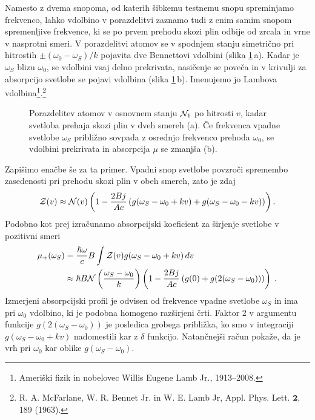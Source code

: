 Namesto z dvema snopoma, od katerih šibkemu testnemu snopu spreminjamo
frekvenco, lahko vdolbino v porazdelitvi zaznamo tudi z enim samim snopom
spremenljive frekvence, ki se po prvem prehodu skozi plin odbije od
zrcala in vrne v nasprotni smeri. V porazdelitvi atomov se
v spodnjem stanju simetrično pri hitrostih $\pm(\omega_{0}-\omega_S)/k$
pojavita dve Bennettovi vdolbini (slika \ref{fig:Lamb}\,a).
Kadar je $\omega_S$ blizu $\omega_{0}$, se vdolbini vsaj delno prekrivata, 
nasičenje se poveča in v krivulji za absorpcijo svetlobe se pojavi 
vdolbina (slika \ref{fig:Lamb}\,b).
Imenujemo jo Lambova vdolbina\footnote{Ameriški fizik in nobelovec 
Willis Eugene Lamb Jr., 1913--2008.}.\footnote{R. A. McFarlane,
W. R. Bennet Jr. in W. E. Lamb Jr, Appl. Phys. Lett. $\mathbf{2}$, 189 (1963).}
\begin{figure}[h]
\centering
\def\svgwidth{140truemm} 

\caption{Porazdelitev atomov v osnovnem stanju ${\cal N}_1$ po hitrosti $v$, kadar svetloba prehaja 
skozi plin v dveh smereh (a). Če frekvenca vpadne svetlobe $\omega_S$ približno 
sovpada z osrednjo frekvenco prehoda $\omega_0$, se vdolbini prekrivata in absorpcija $\mu$ 
se zmanjša (b).}
\label{fig:Lamb}
\end{figure}

Zapišimo enačbe še za ta primer. Vpadni snop svetlobe povzroči spremembo zasedenosti
pri prehodu skozi plin v obeh smereh, zato je zdaj 
\begin{equation}
{\cal Z}(v)\approx{\cal N}(v)\left(1-\frac{2Bj}{Ac}\left(g(\omega_S-\omega_{0}+kv)+
g(\omega_S-\omega_{0}-kv)\right)\right).
\label{4.92}
\end{equation}
Podobno kot prej izračunamo absorpcijski koeficient za širjenje svetlobe v
pozitivni smeri 
\begin{align}
\mu_{+}(\omega_S) & =  \frac{\hslash\omega}{c}B\int{\cal Z}(v)g(\omega_S-\omega_{0}+kv)\, dv\nonumber \\
 & \approx  \hslash B{\cal N}\left(\frac{\omega_S-\omega_0}{k}\right)\left(1-\frac{2Bj}
 {Ac}\left(g(0)+g(2(\omega_S-\omega_{0}))\right)\right)\;.
 \label{eq:lamb}
\end{align}
Izmerjeni absorpcijski profil je odvisen od frekvence vpadne svetlobe $\omega_S$ in ima pri $\omega_0$ vdolbino,
ki je podobna homogeno razširjeni črti. Faktor 2 v argumentu
funkcije $g(2(\omega_S-\omega_{0}))$ je posledica  grobega približka,
ko smo v integraciji $g(\omega_S-\omega_{0}+kv)$ nadomestili kar z
$\delta$ funkcijo. Natančnejši račun pokaže, da je vrh pri $\omega_{0}$
kar oblike $g(\omega_S-\omega_{0})$.

